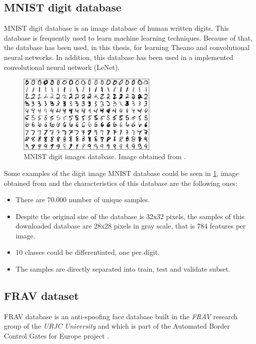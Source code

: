 \subsection{MNIST digit database}\label{subsec:MNIST}
MNIST digit database is an image database of human written digits. This database is frequently used to learn machine learning techniques. Because of that, the database has been used, in this thesis, for learning Theano and convolutional neural networks. In addition, this database has been used in a implemented convolutional neural network (LeNet).\\
\begin{figure}[htb]
\centering
\includegraphics[width=0.6\textwidth]{images_databases/mnistExamples.png}
\caption{MNIST digit images database. Image obtained from \cite{MNISTimage}.} \label{fig:MNIST_digits}
\end{figure}
Some examples of the digit image MNIST database could be seen in \ref{fig:MNIST_digits}, image obtained from \cite{MNISTimage} and the characteristics of this database are the following ones:
\begin{itemize}[itemsep=2pt,topsep=8pt,parsep=0pt,partopsep=20pt]
 \item There are 70.000 number of unique samples.
 \item Despite the original size of the database is 32x32 pixels, the samples of this downloaded database are 28x28 pixels in gray scale, that is 784 features per image.
 \item 10 classes could be differentiated, one per digit.
\item The samples are directly separated into train, test and validate subset.
\end{itemize}

\subsection{FRAV dataset}
FRAV database is an anti-spoofing face database built in the  \textit{FRAV} research group of the \textit{URJC University} and which is part of the Automated Border Control Gates for Europe project \cite{ABC4EU}.\\

